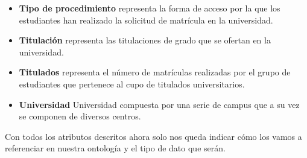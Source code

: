 \begin{itemize}
	\item \textbf{Tipo de procedimiento} representa la forma de acceso por la que los estudiantes han realizado la solicitud de matrícula en la universidad.
	\item \textbf{Titulación} representa las titulaciones de grado que se ofertan en la universidad.
	\item \textbf{Titulados} representa el número de matrículas realizadas por el grupo de estudiantes que pertenece al cupo de titulados universitarios.
	\item \textbf{Universidad} Universidad compuesta por una serie de campus que a su vez se componen de diversos centros.
\end{itemize}

Con todos los atributos descritos ahora solo nos queda indicar cómo los vamos a referenciar en nuestra ontología y el tipo de dato que serán.

